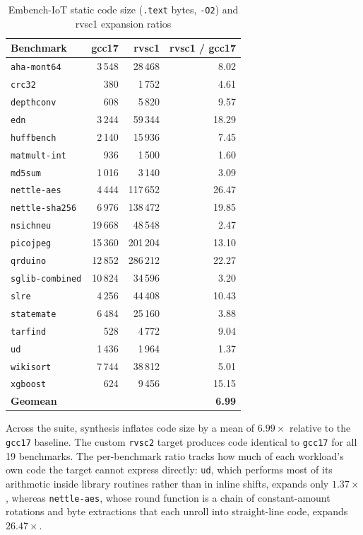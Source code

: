 \begin{table}[htb]
\centering
\caption{Embench-IoT static code size (\texttt{.text} bytes, \texttt{-O2}) and rvsc1 expansion ratios}
\label{tab:embench-size}
\begin{tabular}{lrrr}
\toprule
\textbf{Benchmark} & \textbf{gcc17} & \textbf{rvsc1} & \textbf{rvsc1 / gcc17} \\
\midrule
\texttt{aha-mont64}     &  3\,548 &  28\,468 &  8.02 \\
\texttt{crc32}          &    380  &   1\,752 &  4.61 \\
\texttt{depthconv}      &    608  &   5\,820 &  9.57 \\
\texttt{edn}            &  3\,244 &  59\,344 & 18.29 \\
\texttt{huffbench}      &  2\,140 &  15\,936 &  7.45 \\
\texttt{matmult-int}    &    936  &   1\,500 &  1.60 \\
\texttt{md5sum}         &  1\,016 &   3\,140 &  3.09 \\
\texttt{nettle-aes}     &  4\,444 & 117\,652 & 26.47 \\
\texttt{nettle-sha256}  &  6\,976 & 138\,472 & 19.85 \\
\texttt{nsichneu}       & 19\,668 &  48\,548 &  2.47 \\
\texttt{picojpeg}       & 15\,360 & 201\,204 & 13.10 \\
\texttt{qrduino}        & 12\,852 & 286\,212 & 22.27 \\
\texttt{sglib-combined} & 10\,824 &  34\,596 &  3.20 \\
\texttt{slre}           &  4\,256 &  44\,408 & 10.43 \\
\texttt{statemate}      &  6\,484 &  25\,160 &  3.88 \\
\texttt{tarfind}        &    528  &   4\,772 &  9.04 \\
\texttt{ud}             &  1\,436 &   1\,964 &  1.37 \\
\texttt{wikisort}       &  7\,744 &  38\,812 &  5.01 \\
\texttt{xgboost}        &    624  &   9\,456 & 15.15 \\
\midrule
\textbf{Geomean}        &         &          & \textbf{6.99} \\
\bottomrule
\end{tabular}
\end{table}

Across the suite, synthesis inflates code size by a mean of $6.99\times$ relative to the
\texttt{gcc17} baseline. The custom \texttt{rvsc2} target produces code identical to \texttt{gcc17}
for all 19 benchmarks. The per-benchmark ratio tracks how much of each workload's own code the
target cannot express directly: \texttt{ud}, which performs most of its arithmetic inside library
routines rather than in inline shifts, expands only $1.37\times$, whereas \texttt{nettle-aes}, whose
round function is a chain of constant-amount rotations and byte extractions that each unroll into
straight-line code, expands $26.47\times$.

